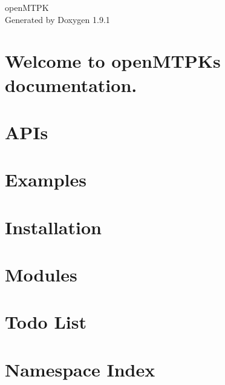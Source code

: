 \let\mypdfximage\pdfximage\def\pdfximage{\immediate\mypdfximage}\documentclass[twoside]{book}
\newcommand{\+}{\discretionary{\mbox{\scriptsize$\hookleftarrow$}}{}{}}
\newcommand{\clearemptydoublepage}{%
  \newpage{\pagestyle{empty}\cleardoublepage}%
}
\begin{document}
\raggedbottom

\hypersetup{pageanchor=false,
             bookmarksnumbered=true,
             pdfencoding=unicode
            }
\begin{titlepage}
\vspace*{7cm}
\begin{center}%
{\Large open\+MTPK }\\
\vspace*{1cm}
{\large Generated by Doxygen 1.9.1}\\
\end{center}
\end{titlepage}
\clearemptydoublepage
{}
\tableofcontents
\clearemptydoublepage
{}
\hypersetup{pageanchor=true}

\chapter{Welcome to open\+MTPK\textquotesingle{}s documentation.}
\label{index}\hypertarget{index}{}
\chapter{APIs}
\label{md_docs_source_APIs}

\chapter{Examples}
\label{md_docs_source_Examples}

\chapter{Installation}
\label{md_docs_source_Installation}

\chapter{Modules}
\label{md_docs_source_Modules}

\chapter{Todo List}
\label{todo}

\chapter{Namespace Index}

\end{document}
